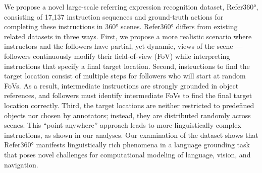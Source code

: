 We propose a novel large-scale referring expression recognition dataset, Refer360°, consisting of 17,137 instruction sequences and ground-truth actions for completing these instructions in 360° scenes. Refer360° differs from existing related datasets in three ways. First, we propose a more realistic scenario where instructors and the followers have partial, yet dynamic, views of the scene --- followers continuously modify their field-of-view (FoV) while interpreting instructions that specify a final target location. Second, instructions to find the target location consist of multiple steps for followers who will start at random FoVs. As a result, intermediate instructions are strongly grounded in object references, and followers must identify intermediate FoVs to find the final target location correctly. Third, the target locations are neither restricted to predefined objects nor chosen by annotators; instead, they are distributed randomly across scenes. This ``point anywhere'' approach leads to more linguistically complex instructions, as shown in our analyses. Our examination of the dataset shows that Refer360° manifests linguistically rich phenomena in a language grounding task that poses novel challenges for computational modeling of language, vision, and navigation.
